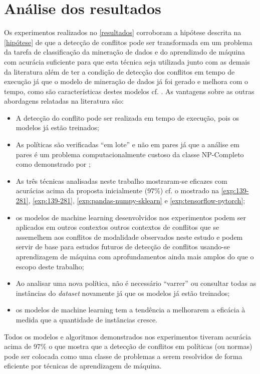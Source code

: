 \section{Análise dos resultados}\label{analise_resultados}
Os experimentos realizados no \autoref{resultados} corroboram a hipótese descrita na  \autoref{hipótese} de que a detecção de conflitos pode ser transformada em um problema da tarefa de classificação da mineração de dados e do aprendizado de máquina com acurácia suficiente para que esta técnica seja utilizada junto com as demais da literatura além de ter a condição de detecção dos conflitos em tempo de execução já que o modelo de mineração de dados já foi gerado e melhora com o tempo, como são características destes modelos cf. . As vantagens sobre as outras abordagens relatadas na literatura são:
\begin{itemize}
	\item A detecção do conflito pode ser realizada em tempo de execução, pois os modelos já estão treinados;	
	\item As políticas são verificadas ``em lote'' e não em pares já que a análise em pares é um problema computacionalmente custoso da classe NP-Completo como demonstrado por ; 
	\item As três técnicas analisadas neste trabalho mostraram-se eficazes com acurácias acima da proposta inicialmente (97\%) cf. o mostrado na \autoref{exp:139-281}, \autoref{exp:139-281}, \autoref{exp:pandas-numpy-sklearn} e \autoref{exp:tensorflow-pytorch};
	\item os modelos de machine learning desenvolvidos nos experimentos podem ser aplicados em outros contextos outros contextos de conflitos que se assemelhem aos conflitos de modalidade  observados neste estudo e podem servir de base para estudos futuros de detecção de conflitos usando-se aprendizagem de máquina com aprofundamentos ainda mais amplos do que o escopo deste trabalho;
	\item Ao analisar uma nova política, não é necessário ``varrer'' ou consultar todas as instâncias do \textit{dataset} novamente já que os modelos já estão treinados;
	\item os modelos de machine learning tem a tendência a melhorarem a eficácia à medida que a quantidade de instâncias cresce.
\end{itemize}

Todos os modelos e algoritmos demonstrados nos experimentos tiveram acurácia acima de 97\% o que mostra que a detecção de conflitos em políticas (ou normas) pode ser colocada como uma classe de problemas a serem resolvidos de forma eficiente por técnicas de aprendizagem de máquina.

